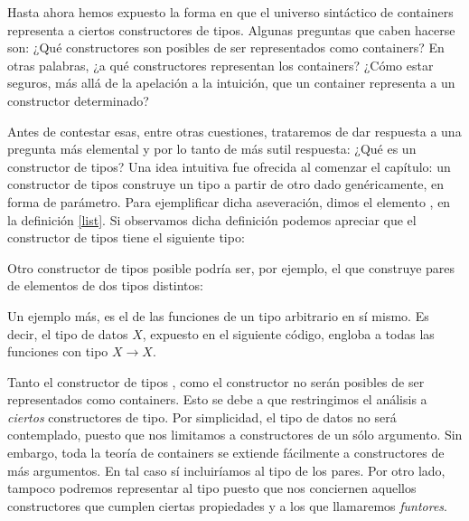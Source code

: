 Hasta ahora hemos expuesto la forma en que el universo sintáctico de
containers representa a ciertos constructores de tipos. Algunas preguntas que caben hacerse son: ¿Qué constructores son posibles de ser representados como containers? En otras palabras, ¿a qué constructores representan los containers? ¿Cómo estar seguros, más allá de la apelación a la intuición, que un container representa a un constructor determinado?

Antes de contestar esas, entre otras cuestiones, trataremos de dar respuesta a una pregunta más elemental y por lo tanto de más sutil respuesta: ¿Qué es un constructor de tipos?
Una idea intuitiva fue ofrecida al comenzar el capítulo: un constructor de tipos construye un tipo a partir de otro dado genéricamente, en forma de parámetro.
Para ejemplificar dicha aseveración, dimos el elemento , en la definición \ref{list}.
Si observamos dicha definición podemos apreciar que el constructor de tipos  tiene el siguiente tipo: 

\sangrar
{} \AgdaSymbol{:}  \AgdaSymbol{$\to$} 

Otro constructor de tipos posible podría ser, por ejemplo, el que construye pares de elementos de dos tipos distintos:

 
Un ejemplo más, es el de las funciones de un tipo arbitrario en sí mismo. Es decir, el tipo de datos  $X$, expuesto en el siguiente código, engloba a todas las funciones con tipo $X \to X$. 
 

 Tanto el constructor de tipos , como el constructor  no serán posibles de ser representados como containers. Esto se debe a que restringimos el análisis a {\it ciertos} constructores de tipo.
Por simplicidad, el tipo de datos  no será contemplado, puesto que nos limitamos a constructores de un sólo argumento. Sin embargo, toda la teoría de containers se extiende fácilmente a constructores de más argumentos. En tal caso sí incluiríamos al tipo de los pares. 
 Por otro lado, tampoco podremos representar al tipo  puesto que nos conciernen aquellos constructores que cumplen ciertas propiedades y a los que llamaremos {\it funtores}.


